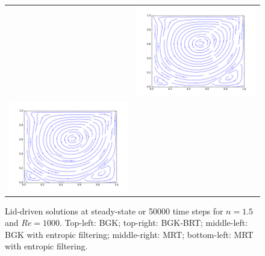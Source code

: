 \begin{figure}
\begin{tabulary}{\linewidth}{c c}
		&
		\includegraphics[width=\figwid]{figs/lid/power_mrt_100_n1.5_Re1000/sl_step-000050000}
		\\
		\includegraphics[width=\figwid]{figs/lid/power_mrt-filter_100_n1.5_Re1000/sl_step-000050000}
	\end{tabulary}
	\caption{Lid-driven solutions at steady-state or 50000 time steps for $n = 1.5$ and $Re = 1000$. Top-left: BGK; top-right: BGK-BRT; middle-left: BGK with entropic filtering; middle-right: MRT; bottom-left: MRT with entropic filtering.}
	\label{fig:lid-n15-Re1000}
\end{figure}

